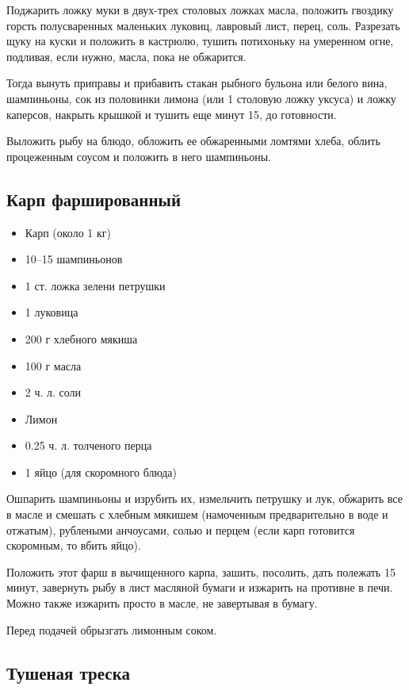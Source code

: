 Поджарить ложку муки в двух-трех столовых ложках масла, положить гвоздику горсть полусваренных маленьких луковиц, лавровый лист, перец, соль. Разрезать щуку на куски и положить в кастрюлю, тушить потихоньку на умеренном огне, подливая, если нужно, масла, пока не обжарится.

Тогда вынуть приправы и прибавить стакан рыбного бульона или белого вина, шампиньоны, сок из половинки лимона (или 1 столовую ложку уксуса) и ложку каперсов, накрыть крышкой и тушить еще минут 15, до готовности.

Выложить рыбу на блюдо, обложить ее обжаренными ломтями хлеба, облить процеженным соусом и положить в него шампиньоны.

\subsection{Карп фаршированный}

\begin{itemize} 
	\item  Карп (около 1 кг) 
    \item  10–15 шампиньонов 
    \item  1 ст. ложка зелени петрушки 
    \item  1 луковица 
    \item  200 г хлебного мякиша 
    \item  100 г масла 
    \item  2 ч. л. соли 
    \item  Лимон 
    \item  0.25 ч. л. толченого перца 
    \item  1 яйцо (для скоромного блюда)
\end{itemize}

Ошпарить шампиньоны и изрубить их, измельчить петрушку и лук, обжарить все в масле и смешать с хлебным мякишем (намоченным предварительно в воде и отжатым), рублеными анчоусами, солью и перцем (если карп готовится скоромным, то вбить яйцо).

Положить этот фарш в вычищенного карпа, зашить, посолить, дать полежать 15 минут, завернуть рыбу в лист масляной бумаги и изжарить на противне в печи. Можно также изжарить просто в масле, не завертывая в бумагу.

Перед подачей обрызгать лимонным соком.

\subsection{Тушеная треска}

